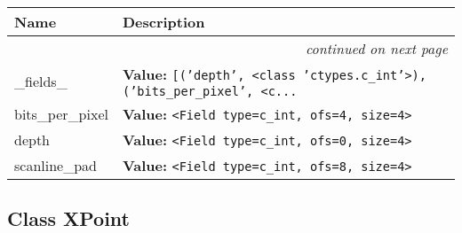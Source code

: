     \vspace{-1cm}
\hspace{\varindent}\begin{longtable}{|p{\varnamewidth}|p{\vardescrwidth}|l}
\cline{1-2}
\cline{1-2} \centering \textbf{Name} & \centering \textbf{Description}& \\
\cline{1-2}
\endhead\cline{1-2}\multicolumn{3}{r}{\small\textit{continued on next page}}\\\endfoot\cline{1-2}
\endlastfoot\raggedright \_\-f\-i\-e\-l\-d\-s\-\_\- & \raggedright \textbf{Value:} 
{\tt \texttt{[}\texttt{(}\texttt{'}\texttt{depth}\texttt{'}\texttt{, }{\textless}class 'ctypes.c\_int'{\textgreater}\texttt{)}\texttt{, }\texttt{(}\texttt{'}\texttt{bits\_per\_pixel}\texttt{'}\texttt{, }{\textless}c\texttt{...}}&\\
\cline{1-2}
\raggedright b\-i\-t\-s\-\_\-p\-e\-r\-\_\-p\-i\-x\-e\-l\- & \raggedright \textbf{Value:} 
{\tt {\textless}Field type=c\_int, ofs=4, size=4{\textgreater}}&\\
\cline{1-2}
\raggedright d\-e\-p\-t\-h\- & \raggedright \textbf{Value:} 
{\tt {\textless}Field type=c\_int, ofs=0, size=4{\textgreater}}&\\
\cline{1-2}
\raggedright s\-c\-a\-n\-l\-i\-n\-e\-\_\-p\-a\-d\- & \raggedright \textbf{Value:} 
{\tt {\textless}Field type=c\_int, ofs=8, size=4{\textgreater}}&\\
\cline{1-2}
\end{longtable}



\subsection{Class XPoint}

